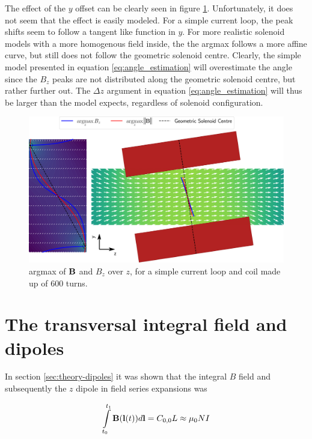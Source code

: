 The effect of the $y$ offset can be clearly seen in figure
\ref{fig:sim-mag-fieldmap-argmax}. Unfortunately, it does not seem
that the effect is easily modeled. For a simple current loop, the peak
shifts seem to follow a tangent like function in $y$.
For more realistic solenoid models with a more homogenous
field inside, the the argmax follows a more affine curve,
but still does not follow the geometric solenoid centre.
Clearly, the simple model
presented in equation \ref{eq:angle_estimation} will overestimate
the angle since the $B_z$ peaks are not distributed along the geometric
solenoid centre, but rather further out. The $\Delta z$ argument in
equation \ref{eq:angle_estimation} will thus be larger than the model
expects, regardless of solenoid configuration.


\begin{figure}[h!]
    \centering
    \includegraphics[width=\linewidth]{figs/sim-fieldmap}
    \caption{argmax of $\vb{B}$ and $B_z$  over $z$, for a simple current
        loop and coil made up of 600 turns.}
    \label{fig:sim-mag-fieldmap-argmax}
\end{figure}

\section{The transversal integral field and dipoles}
\label{sec:dipole-simulations}
In section \ref{sec:theory-dipoles} it was shown that the integral
$B$ field and subsequently the $z$ dipole in field
series expansions was


\begin{equation}
    \int \limits_{t_0}^{t_1} \vb{B}(\vb{l}(t))d\vb{l} = C_{0,0}L \approx \mu_0 NI
    \label{eq:Bzlineint}
\end{equation}

